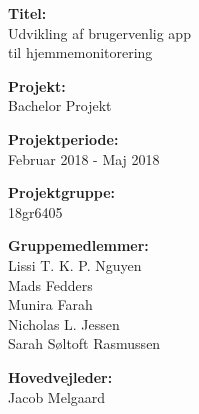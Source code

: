 \begin{minipage}[t]{0.48\textwidth}
\textbf{Titel:} %
\\\hspace*{2ex} 
Udvikling af brugervenlig app\\\hspace*{2ex} 
til hjemmemonitorering  \\\hspace*{2ex} 

\textbf{Projekt:} %
\\\hspace*{2ex}
Bachelor Projekt \\\hspace*{2ex}

\textbf{Projektperiode:} %
\\\hspace*{2ex}
Februar 2018 - Maj 2018 \\\hspace*{2ex}

\textbf{Projektgruppe:} %
\\\hspace*{2ex}
18gr6405 \\\hspace*{2ex}

\textbf{Gruppemedlemmer:} %
\\\hspace*{2ex}
Lissi T. K. P. Nguyen\\\hspace*{2ex}
Mads Fedders \\\hspace*{2ex}
Munira Farah\\\hspace*{2ex}
Nicholas L. Jessen\\ \bigskip\hspace{2ex}
Sarah Søltoft Rasmussen\\\hspace*{2ex}


\textbf{Hovedvejleder:} %
\\\hspace*{2ex}Jacob Melgaard
 \\ \bigskip\hspace{2ex}
 

\end{minipage}
